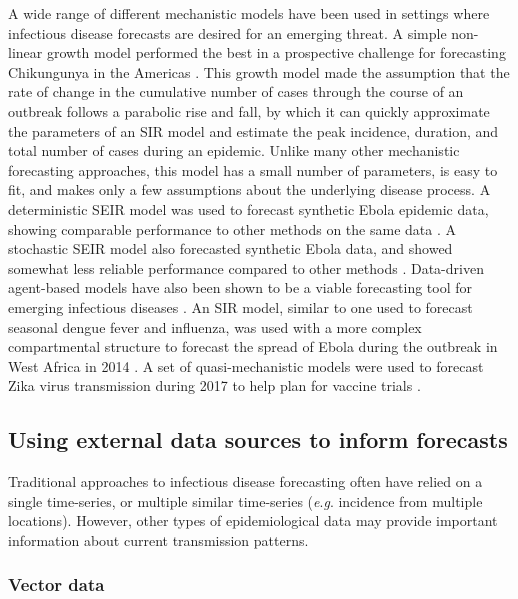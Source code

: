 \documentclass[a4paper]{article}
\newcommand{\eg}{\textit{e}.\textit{g}. }
\begin{document}
A wide range of different mechanistic models have been used in settings where infectious disease forecasts are desired for an emerging threat. 
A simple non-linear growth model performed the best in a prospective challenge for forecasting Chikungunya in the Americas \cite{lega2016data}.
This growth model made the assumption that the rate of change in the cumulative number of cases through the course of an outbreak follows a parabolic rise and fall, by which it can quickly approximate the parameters of an SIR model and estimate the peak incidence, duration, and total number of cases during an epidemic.
Unlike many other mechanistic forecasting approaches, this model has a small number of parameters, is easy to fit, and makes only a few assumptions about the underlying disease process. 
A deterministic SEIR model was used to forecast synthetic Ebola epidemic data, showing comparable performance to other methods on the same data \cite{gaffey2017application, viboud2017rapidd}.
A stochastic SEIR model also forecasted synthetic Ebola data, and showed somewhat less reliable performance compared to other methods \cite{funk2016real}.
Data-driven agent-based models have also been shown to be a viable forecasting tool for emerging infectious diseases \cite{venkatramanan2017using}.
An SIR model, similar to one used to forecast seasonal dengue fever and influenza, was used with a more complex compartmental structure to forecast the spread of Ebola during the outbreak in West Africa in 2014 \cite{Shaman2014}.
A set of quasi-mechanistic models were used to forecast Zika virus transmission during 2017 to help plan for vaccine trials \cite{Asher2017}.

\subsection{Using external data sources to inform forecasts}

Traditional approaches to infectious disease forecasting often have relied on a single time-series, or multiple similar time-series (\eg incidence from multiple locations).
However, other types of epidemiological data may provide important information about current transmission patterns.

\subsubsection*{Vector data} \label{sub:vectordata}
\end{document}
